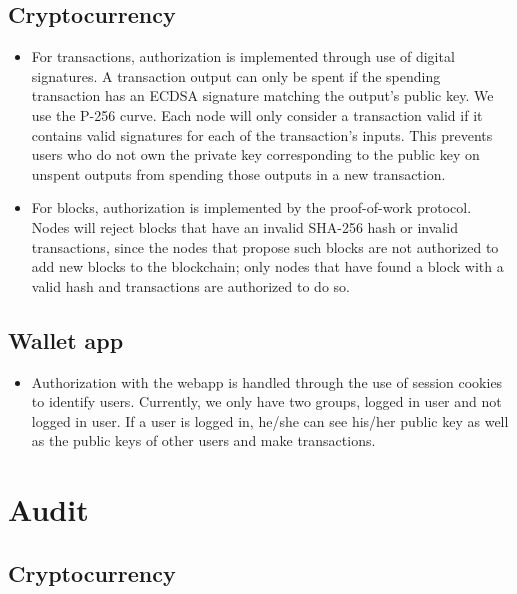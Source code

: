\documentclass[a4paper,12pt]{article}
\begin{document}
\subsection{Cryptocurrency}
\begin{itemize}
\item For transactions, authorization is implemented through use of digital signatures. A transaction output can only be spent if the spending transaction has an ECDSA signature matching the output's public key.
We use the P-256 curve.
Each node will only consider a transaction valid if it contains valid signatures for each of the transaction's inputs.
This prevents users who do not own the private key corresponding to the public key on unspent outputs from spending those outputs in a new transaction.
\item For blocks, authorization is implemented by the proof-of-work protocol.
Nodes will reject blocks that have an invalid SHA-256 hash or invalid transactions, since the nodes that propose such blocks are not authorized to add new blocks to the blockchain; only nodes that have found a block with a valid hash and transactions are authorized to do so.
\end{itemize}

\subsection{Wallet app}

\begin{itemize}
\item Authorization with the webapp is handled through the use of session cookies to identify users. Currently, we only have two groups, logged in user and not logged in user. If a user is logged in, he/she can see his/her public key as well as the public keys of other users and make transactions. 
\end{itemize}

\section{Audit}

\subsection{Cryptocurrency}
\end{document}
